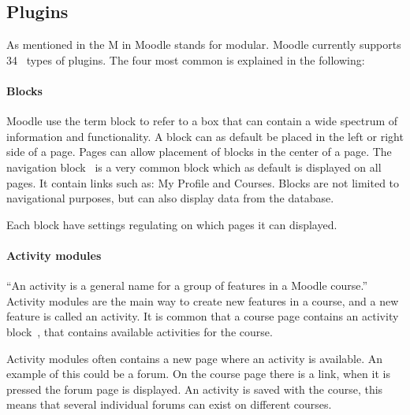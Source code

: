 \subsection{Plugins}

As mentioned in  the M in Moodle stands for modular. 
Moodle currently supports 34~\cite{plugin} types of plugins.
The four most common is explained in the following:




\paragraph{Blocks}
\label{subsec:blocks}
Moodle use the term block to refer to a box that can contain a wide spectrum of information and functionality.
A block can as default be placed in the left or right side of a page. 
Pages can allow placement of blocks in the center of a page.
The navigation block~\cite{navigationblock} is a very common block which as default is displayed on all pages. 
It contain links such as: My Profile and Courses. 
Blocks are not limited to navigational purposes, but can also display data from the database.

Each block have settings regulating on which pages it can displayed. %




\paragraph{Activity modules}
``An activity is a general name for a group of features in a Moodle course.''~\cite{activity} 
Activity modules are the main way to create new features in a course, and a new feature is called an activity. 
It is common that a course page contains an activity block~\cite{activityblock}, that contains available activities for the course. 

Activity modules often contains a new page where an activity is available. 
An example of this could be a forum. 
On the course page there is a link, when it is pressed the forum page is displayed. 
An activity is saved with the course, this means that several individual forums can exist on different courses.

